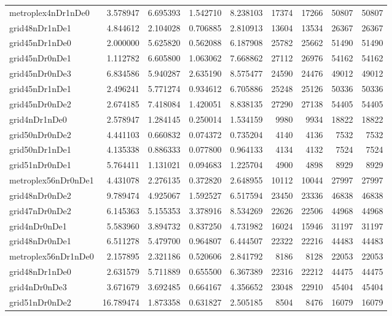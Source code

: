 \begin{longtable}{|l|r|r|r|r|r|r|r|r|}
metroplex4nDr1nDe0 & 3.578947 & 6.695393 & 1.542710 & 8.238103 & 17374 & 17266 & 50807 & 50807 \\
grid48nDr1nDe1 & 4.844612 & 2.104028 & 0.706885 & 2.810913 & 13604 & 13534 & 26367 & 26367 \\
grid45nDr1nDe0 & 2.000000 & 5.625820 & 0.562088 & 6.187908 & 25782 & 25662 & 51490 & 51490 \\
grid45nDr0nDe1 & 1.112782 & 6.605800 & 1.063062 & 7.668862 & 27112 & 26976 & 54162 & 54162 \\
grid45nDr0nDe3 & 6.834586 & 5.940287 & 2.635190 & 8.575477 & 24590 & 24476 & 49012 & 49012 \\
grid45nDr1nDe1 & 2.496241 & 5.771274 & 0.934612 & 6.705886 & 25248 & 25126 & 50336 & 50336 \\
grid45nDr0nDe2 & 2.674185 & 7.418084 & 1.420051 & 8.838135 & 27290 & 27138 & 54405 & 54405 \\
grid4nDr1nDe0 & 2.578947 & 1.284145 & 0.250014 & 1.534159 & 9980 & 9934 & 18822 & 18822 \\
grid50nDr0nDe2 & 4.441103 & 0.660832 & 0.074372 & 0.735204 & 4140 & 4136 & 7532 & 7532 \\
grid50nDr1nDe1 & 4.135338 & 0.886333 & 0.077800 & 0.964133 & 4134 & 4132 & 7524 & 7524 \\
grid51nDr0nDe1 & 5.764411 & 1.131021 & 0.094683 & 1.225704 & 4900 & 4898 & 8929 & 8929 \\
metroplex56nDr0nDe1 & 4.431078 & 2.276135 & 0.372820 & 2.648955 & 10112 & 10044 & 27997 & 27997 \\
grid48nDr0nDe2 & 9.789474 & 4.925067 & 1.592527 & 6.517594 & 23450 & 23336 & 46838 & 46838 \\
grid47nDr0nDe2 & 6.145363 & 5.155353 & 3.378916 & 8.534269 & 22626 & 22506 & 44968 & 44968 \\
grid4nDr0nDe1 & 5.583960 & 3.894732 & 0.837250 & 4.731982 & 16024 & 15946 & 31197 & 31197 \\
grid48nDr0nDe1 & 6.511278 & 5.479700 & 0.964807 & 6.444507 & 22322 & 22216 & 44483 & 44483 \\
metroplex56nDr1nDe0 & 2.157895 & 2.321186 & 0.520606 & 2.841792 & 8186 & 8128 & 22053 & 22053 \\
grid48nDr1nDe0 & 2.631579 & 5.711889 & 0.655500 & 6.367389 & 22316 & 22212 & 44475 & 44475 \\
grid4nDr0nDe3 & 3.671679 & 3.692485 & 0.664167 & 4.356652 & 23048 & 22910 & 45404 & 45404 \\
grid51nDr0nDe2 & 16.789474 & 1.873358 & 0.631827 & 2.505185 & 8504 & 8476 & 16079 & 16079 \\

\end{longtable}
